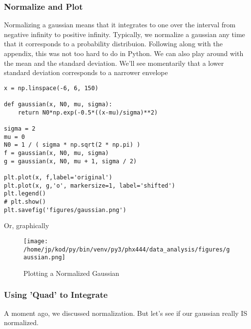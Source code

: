 \documentclass{article}
\begin{document}
\subsubsection{Normalize and Plot}
Normalizing a gaussian means that it integrates to one over the interval from
negative infinity to positive infinity. Typically, we normalize a gaussian any
time that it corresponds to a probability distribuion. Following along with the
appendix, this was not too hard to do in Python. We can also play around with
the mean and the standard deviation. We'll see momentarily that a lower
standard deviation corresponds to a narrower envelope
\begin{center}
\begin{minipage}[t]{.85\textwidth}
\begin{lstlisting}[frame=tlrb]
x = np.linspace(-6, 6, 150)

def gaussian(x, N0, mu, sigma):
    return N0*np.exp(-0.5*((x-mu)/sigma)**2)

sigma = 2
mu = 0
N0 = 1 / ( sigma * np.sqrt(2 * np.pi) )
f = gaussian(x, N0, mu, sigma)
g = gaussian(x, N0, mu + 1, sigma / 2)

plt.plot(x, f,label='original')
plt.plot(x, g,'o', markersize=1, label='shifted')
plt.legend()
# plt.show()
plt.savefig('figures/gaussian.png')
\end{lstlisting}
\end{minipage}
\end{center}

Or, graphically
\begin{figure}[H]
        \begin{center}
        \texttt{[image: /home/jp/kod/py/bin/venv/py3/phx444/data\_analysis/figures/gaussian.png]}
        \caption{Plotting a Normalized Gaussian}
        \label{fig:fig_13}
        \end{center}
\end{figure}

\subsubsection{Using 'Quad' to Integrate}
A moment ago, we discussed normalization. But let's see if our gaussian really
IS normalized. 
\end{document}
